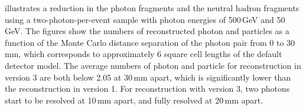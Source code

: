  illustrates a reduction in the photon fragments and the neutral hadron fragments using a two-photon-per-event sample with photon energies of  500\,GeV and 50\,GeV. The figures show the numbers of reconstructed photon and particles as a function of  the Monte Carlo distance separation of the photon pair from 0 to 30\,mm, which corresponds to approximately 6 \ECAL square cell lengths of the default \ILD detector model.  The average numbers of photon and particle for reconstruction in \pandora version 3 are both below 2.05 at 30\,mm apart, which is significantly lower than the reconstruction in \pandora version 1. For reconstruction with \pandora version 3, two photons start to be resolved at 10\,mm apart, and fully resolved at 20\,mm apart.


